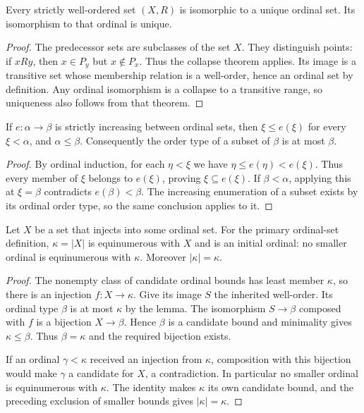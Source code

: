 \begin{corollary}
\label{thm:set_wellorder_type}
Every strictly well-ordered set $(X,R)$ is isomorphic to a unique ordinal
set. Its isomorphism to that ordinal is unique.
\end{corollary}
\begin{proof}
The predecessor sets are subclasses of the set $X$. They distinguish
points: if $xRy$, then $x\in P_y$ but $x\notin P_x$.
Thus the collapse theorem applies. Its image is a transitive set whose
membership relation is a well-order, hence an ordinal set by definition.
Any ordinal isomorphism is a collapse to a transitive range, so uniqueness
also follows from that theorem.
\end{proof}

\begin{lemma}
If $e:\alpha\to\beta$ is strictly increasing between ordinal sets, then
$\xi\leq e(\xi)$ for every $\xi<\alpha$, and $\alpha\leq\beta$.
Consequently the order type of a subset of $\beta$ is at most $\beta$.
\end{lemma}
\begin{proof}
By ordinal induction, for each $\eta<\xi$ we have
$\eta\leq e(\eta)<e(\xi)$. Thus every member of $\xi$ belongs to
$e(\xi)$, proving $\xi\subseteq e(\xi)$. If $\beta<\alpha$, applying
this at $\xi=\beta$ contradicts $e(\beta)<\beta$.
The increasing enumeration of a subset exists by its ordinal order type,
so the same conclusion applies to it.
\end{proof}

\begin{theorem}
Let $X$ be a set that injects into some ordinal set. For the primary
ordinal-set definition, $\kappa=|X|$ is equinumerous with $X$ and is
an initial ordinal: no smaller ordinal is equinumerous with $\kappa$.
Moreover $|\kappa|=\kappa$.
\end{theorem}
\begin{proof}
The nonempty class of candidate ordinal bounds has least member
$\kappa$, so there is an injection $f:X\to\kappa$. Give its image
$S$ the inherited well-order. Its ordinal type $\beta$ is at most
$\kappa$ by the lemma. The isomorphism $S\to\beta$ composed with $f$
is a bijection $X\to\beta$. Hence $\beta$ is a candidate bound and
minimality gives $\kappa\leq\beta$. Thus $\beta=\kappa$ and the
required bijection exists.

If an ordinal $\gamma<\kappa$ received an injection from $\kappa$,
composition with this bijection would make $\gamma$ a candidate for
$X$, a contradiction. In particular no smaller ordinal is equinumerous
with $\kappa$. The identity makes $\kappa$ its own candidate bound,
and the preceding exclusion of smaller bounds gives $|\kappa|=\kappa$.
\end{proof}

